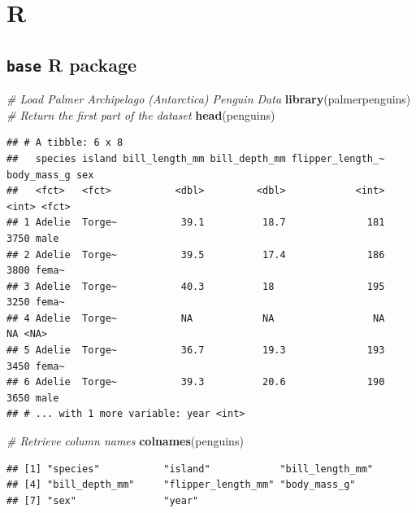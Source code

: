 \documentclass[]{book}
\newenvironment{Shaded}{\begin{snugshade}}{\end{snugshade}}
\newcommand{\CommentTok}[1]{\textcolor[rgb]{0.56,0.35,0.01}{\textit{#1}}}
\newcommand{\KeywordTok}[1]{\textcolor[rgb]{0.13,0.29,0.53}{\textbf{#1}}}
\newcommand{\NormalTok}[1]{#1}
\begin{document}
\hypertarget{r-4}{%
\section{R}\label{r-4}}

\hypertarget{base-r-package}{%
\subsection{\texorpdfstring{\texttt{base} R package}{base R package}}\label{base-r-package}}

\begin{Shaded}
\begin{Highlighting}[]
\CommentTok{# Load Palmer Archipelago (Antarctica) Penguin Data}
\KeywordTok{library}\NormalTok{(palmerpenguins)}
\CommentTok{# Return the first part of the dataset}
\KeywordTok{head}\NormalTok{(penguins)}
\end{Highlighting}
\end{Shaded}

\begin{verbatim}
## # A tibble: 6 x 8
##   species island bill_length_mm bill_depth_mm flipper_length_~ body_mass_g sex  
##   <fct>   <fct>           <dbl>         <dbl>            <int>       <int> <fct>
## 1 Adelie  Torge~           39.1          18.7              181        3750 male 
## 2 Adelie  Torge~           39.5          17.4              186        3800 fema~
## 3 Adelie  Torge~           40.3          18                195        3250 fema~
## 4 Adelie  Torge~           NA            NA                 NA          NA <NA> 
## 5 Adelie  Torge~           36.7          19.3              193        3450 fema~
## 6 Adelie  Torge~           39.3          20.6              190        3650 male 
## # ... with 1 more variable: year <int>
\end{verbatim}

\begin{Shaded}
\begin{Highlighting}[]
\CommentTok{# Retrieve column names}
\KeywordTok{colnames}\NormalTok{(penguins)}
\end{Highlighting}
\end{Shaded}

\begin{verbatim}
## [1] "species"           "island"            "bill_length_mm"   
## [4] "bill_depth_mm"     "flipper_length_mm" "body_mass_g"      
## [7] "sex"               "year"
\end{verbatim}
\end{document}
